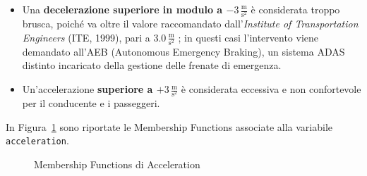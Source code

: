 \begin{itemize}
  \item Una \textbf{decelerazione superiore in modulo a \(-3\,\tfrac{\mathrm{m}}{\mathrm{s^2}}\)} 
  è considerata troppo brusca, poiché va oltre il valore raccomandato 
  dall'\textit{Institute of Transportation Engineers} (ITE, 1999), pari a \(3.0\,\tfrac{\mathrm{m}}{\mathrm{s^2}}\) \cite{comfortable_deceleration_rate}; 
  in questi casi l'intervento viene demandato all'AEB (Autonomous Emergency Braking), un sistema ADAS distinto 
  incaricato della gestione delle frenate di emergenza.
  \item Un'accelerazione \textbf{superiore a \(+3\,\tfrac{\mathrm{m}}{\mathrm{s^2}}\)} è considerata eccessiva e non 
  confortevole per il conducente e i passeggeri.
\end{itemize}

\noindent In Figura~\ref{Fig:mf_acceleration} sono riportate le Membership Functions associate alla variabile \texttt{acceleration}.
\begin{figure}[H]
    \centering
    \caption{Membership Functions di Acceleration}
    \label{Fig:mf_acceleration}
\end{figure}